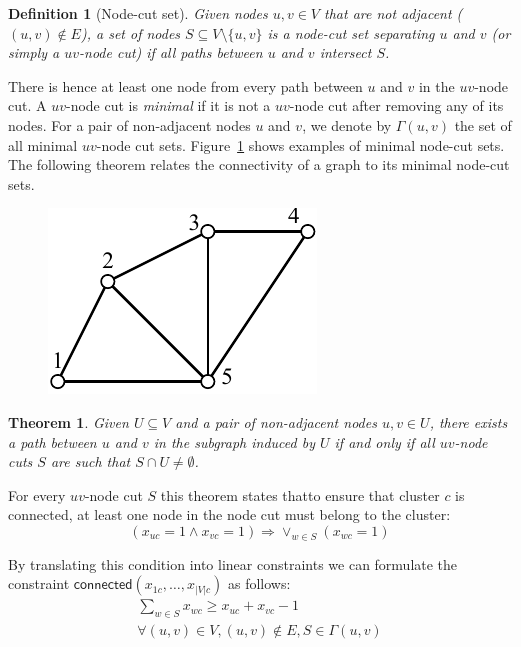 \documentclass[conference]{IEEEtran}
\newtheorem{theorem}{Theorem}
\newtheorem{definition}{Definition}
\begin{document}
\begin{definition}[Node-cut set]
Given nodes $u, v \in V$ that are not adjacent ($(u, v) \notin E$), a set of nodes $S \subseteq V \setminus \{u, v\}$ is a \emph{node-cut set} separating $u$ and $v$ (or simply a \emph{$uv$-node cut}) if all paths between $u$ and $v$ intersect $S$.
\end{definition}
There is hence at least one node from every path between $u$ and $v$ in the $uv$-node cut.
A $uv$-node cut is \emph{minimal} if it is not a $uv$-node cut after removing any of its nodes. For a pair of non-adjacent nodes $u$ and $v$, we denote by $\Gamma(u, v)$ the set of all minimal $uv$-node cut sets. Figure~\ref{fig:cutset} shows examples of minimal node-cut sets. The following theorem relates the connectivity of a graph to its minimal node-cut sets. 
%
\begin{figure}
\centering
\includegraphics[scale=0.7]{images/cutset}
\captionsetup{font=small}
\label{fig:cutset}
\end{figure}
%
\begin{theorem}
Given $U \subseteq V$ and a pair of non-adjacent nodes $u, v \in U$, there exists a path between $u$ and $v$ in the subgraph induced by $U$ if and only if all $uv$-node cuts $S$ are such that $S \cap U \neq \emptyset$.
\label{theorem:cutset}
\end{theorem}
%
For every $uv$-node cut $S$ this theorem states thatto ensure that cluster $c$ is connected, at least one node in the node cut must belong to the cluster:
%
\begin{equation*}
(x_{uc}=1 \land x_{vc}=1) \Rightarrow \lor_{w \in S} (x_{wc}=1)
\end{equation*}

By translating this condition into linear constraints we can formulate the constraint $\mathsf{connected}(x_{1c}, \ldots, x_{|V|c})$ as follows:
%
\begin{multline}
\sum_{w \in S} x_{wc} \geq x_{uc} + x_{vc} - 1 \\
\forall (u, v) \in V, (u, v) \notin E, S \in \Gamma(u, v)
\label{eq:connectivity}
\end{multline}
\end{document}
